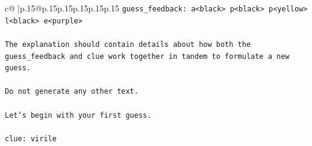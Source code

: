 \documentclass{article}
\begin{document}
{\begin{supertabular}{c@{$\;$}|p{.15\linewidth}@{}p{.15\linewidth}p{.15\linewidth}p{.15\linewidth}p{.15\linewidth}p{.15\linewidth}}
{{{\texttt{guess\_feedback: a<black> p<black> p<yellow> l<black> e<purple>} \\
\\ 
\texttt{The explanation should contain details about how both the guess\_feedback and clue work together in tandem to formulate a new guess.} \\
\\ 
\texttt{Do not generate any other text.} \\
\\ 
\texttt{Let's begin with your first guess.} \\
\\ 
\texttt{clue: virile} \\
            }
        }
    }
     \\ \\


\end{supertabular}}
\end{document}
